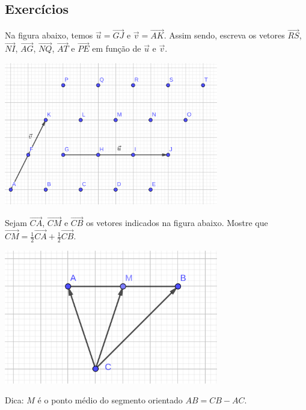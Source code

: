 \subsection*{Exercícios}

\begin{exer}\label{exer:vetor_prob_01}
  Na figura abaixo, temos $\vec{u} = \overrightarrow{GJ}$ e $\vec{v} = \overrightarrow{AK}$. Assim sendo, escreva os vetores $\overrightarrow{RS}$, $\overrightarrow{NI}$, $\overrightarrow{AG}$, $\overrightarrow{NQ}$, $\overrightarrow{AT}$ e $\overrightarrow{PE}$ em função de $\vec{u}$ e $\vec{v}$.

  \includegraphics[width=0.7\textwidth]{./cap_vetor/dados/fig_exer_prob_01/fig_exer_prob_01}
\end{exer}

\begin{exer}\label{exer:vetor_prob_02}
  Sejam $\overrightarrow{CA}$, $\overrightarrow{CM}$ e $\overrightarrow{CB}$ os vetores indicados na figura abaixo. Mostre que $\overrightarrow{CM} = \frac{1}{2}\overrightarrow{CA} + \frac{1}{2}\overrightarrow{CB}$.

  \includegraphics[width=0.7\textwidth]{./cap_vetor/dados/fig_exer_prob_02/fig_exer_prob_02}
\end{exer}
\begin{resp}
  Dica: $M$ é o ponto médio do segmento orientado $AB = CB - AC$.
\end{resp}

